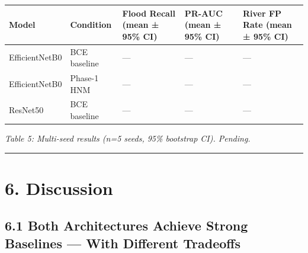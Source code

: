\documentclass[
  11pt,
]{article}
\newcounter{none} %
\begin{document}
{\def\LTcaptype{none} %
\begin{longtable}[]{@{}
  >{\raggedright\arraybackslash}p{}
  >{\raggedright\arraybackslash}p{}
  >{\raggedright\arraybackslash}p{}
  >{\raggedright\arraybackslash}p{}
  >{\raggedright\arraybackslash}p{}@{}}
\toprule\noalign{}
\begin{minipage}[b]{\linewidth}\raggedright
Model
\end{minipage} & \begin{minipage}[b]{\linewidth}\raggedright
Condition
\end{minipage} & \begin{minipage}[b]{\linewidth}\raggedright
Flood Recall (mean ± 95\% CI)
\end{minipage} & \begin{minipage}[b]{\linewidth}\raggedright
PR-AUC (mean ± 95\% CI)
\end{minipage} & \begin{minipage}[b]{\linewidth}\raggedright
River FP Rate (mean ± 95\% CI)
\end{minipage} \\
\midrule\noalign{}
\endhead
\bottomrule\noalign{}
\endlastfoot
EfficientNetB0 & BCE baseline & --- & --- & --- \\
EfficientNetB0 & Phase-1 HNM & --- & --- & --- \\
ResNet50 & BCE baseline & --- & --- & --- \\
\end{longtable}
}

\emph{Table 5: Multi-seed results (n=5 seeds, 95\% bootstrap CI).
Pending.}

\begin{center}\rule{0.5\linewidth}{0.5pt}\end{center}

\section{6. Discussion}\label{discussion}

\subsection{6.1 Both Architectures Achieve Strong Baselines --- With
Different
Tradeoffs}\label{both-architectures-achieve-strong-baselines-with-different-tradeoffs}
\end{document}

